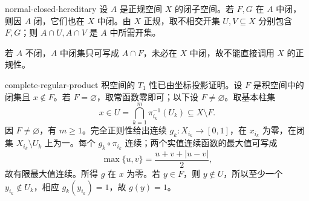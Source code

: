 \begin{solution}{normal-closed-hereditary}
设 \(A\) 是正规空间 \(X\) 的闭子空间。若 \(F,G\) 在 \(A\) 中闭，则因 \(A\) 闭，它们也在 \(X\) 中闭。由 \(X\) 正规，取不相交开集 \(U,V\subseteq X\) 分别包含 \(F,G\)；则 \(A\cap U,A\cap V\) 是 \(A\) 中所需开集。

若 \(A\) 不闭，\(A\) 中闭集只可写成 \(A\cap F\)，未必在 \(X\) 中闭，故不能直接调用 \(X\) 的正规性。
\end{solution}

\begin{solution}{complete-regular-product}
积空间的 \(T_1\) 性已由坐标投影证明。设 \(F\) 是积空间中的闭集且 \(x\notin F\)。若 \(F=\varnothing\)，取常函数零即可；以下设 \(F\ne\varnothing\)。取基本柱集
\[
 x\in U=\bigcap_{k=1}^m\pi_{i_k}^{-1}(U_k)\subseteq X\setminus F.
\]
因 \(F\ne\varnothing\)，有 \(m\ge1\)。完全正则性给出连续 \(g_k:X_{i_k}\to[0,1]\)，在 \(x_{i_k}\) 为零，在闭集 \(X_{i_k}\setminus U_k\) 上为一。每个 \(g_k\circ\pi_{i_k}\) 连续；两个实值连续函数的最大值可写成
\[
 \max\{u,v\}=\frac{u+v+|u-v|}{2},
\]
故有限最大值连续。所得 \(g\) 在 \(x\) 为零。若 \(y\in F\)，则 \(y\notin U\)，所以至少一个 \(y_{i_k}\notin U_k\)，相应 \(g_k(y_{i_k})=1\)，故 \(g(y)=1\)。
\end{solution}
